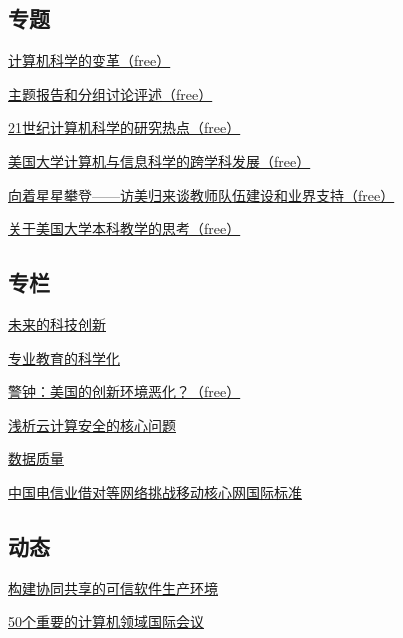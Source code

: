 \documentclass[a4paper]{article}
\begin{document}
\subsection{专题}
\href{http://history.ccf.org.cn/resources/1190201776262/2010/04/15/036006.pdf}{计算机科学的变革（free）}

\href{http://history.ccf.org.cn/resources/1190201776262/2010/04/15/036010.pdf}{主题报告和分组讨论评述（free）}

\href{http://history.ccf.org.cn/resources/1190201776262/2010/04/15/036015.pdf}{21世纪计算机科学的研究热点（free）}

\href{http://history.ccf.org.cn/resources/1190201776262/2010/04/15/036023.pdf}{美国大学计算机与信息科学的跨学科发展（free）}

\href{http://history.ccf.org.cn/resources/1190201776262/2010/04/15/036028.pdf}{向着星星攀登——访美归来谈教师队伍建设和业界支持（free）}

\href{http://history.ccf.org.cn/resources/1190201776262/2010/04/15/036035.pdf}{关于美国大学本科教学的思考（free）}

\subsection{专栏}
\href{http://history.ccf.org.cn/resources/1190201776262/2010/04/15/036040.pdf}{未来的科技创新}

\href{http://history.ccf.org.cn/resources/1190201776262/2010/04/15/036042.pdf}{专业教育的科学化}

\href{http://history.ccf.org.cn/resources/1190201776262/2010/04/15/036038.pdf}{警钟：美国的创新环境恶化？（free）}

\href{http://history.ccf.org.cn/resources/1190201776262/2010/04/15/036047.pdf}{浅析云计算安全的核心问题}

\href{http://history.ccf.org.cn/resources/1190201776262/2010/04/15/036049.pdf}{数据质量}

\href{http://history.ccf.org.cn/resources/1190201776262/2010/04/15/036052.pdf}{中国电信业借对等网络挑战移动核心网国际标准}

\subsection{动态}
\href{http://history.ccf.org.cn/resources/1190201776262/2010/04/15/036056.pdf}{构建协同共享的可信软件生产环境}

\href{http://history.ccf.org.cn/resources/1190201776262/2010/04/15/036062.pdf}{50个重要的计算机领域国际会议}
\end{document}
